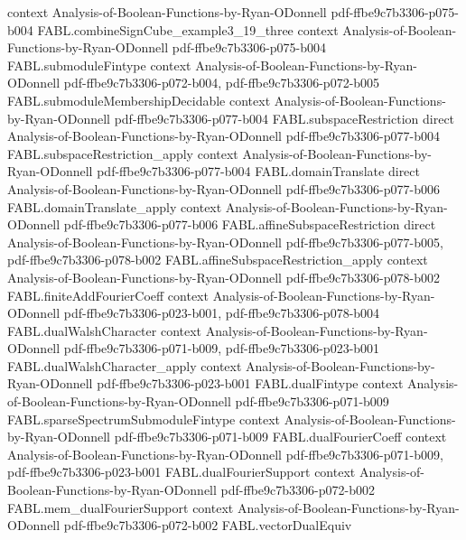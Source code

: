 \begin{theorem}
  {context}
  {Analysis-of-Boolean-Functions-by-Ryan-ODonnell}
  {pdf-ffbe9c7b3306-p075-b004}
\proofstep
  {FABL.combineSignCube_example3_19_three}
  {context}
  {Analysis-of-Boolean-Functions-by-Ryan-ODonnell}
  {pdf-ffbe9c7b3306-p075-b004}
\proofstep
  {FABL.submoduleFintype}
  {context}
  {Analysis-of-Boolean-Functions-by-Ryan-ODonnell}
  {pdf-ffbe9c7b3306-p072-b004,
    pdf-ffbe9c7b3306-p072-b005}
\proofstep
  {FABL.submoduleMembershipDecidable}
  {context}
  {Analysis-of-Boolean-Functions-by-Ryan-ODonnell}
  {pdf-ffbe9c7b3306-p077-b004}
\proofstep
  {FABL.subspaceRestriction}
  {direct}
  {Analysis-of-Boolean-Functions-by-Ryan-ODonnell}
  {pdf-ffbe9c7b3306-p077-b004}
\proofstep
  {FABL.subspaceRestriction_apply}
  {context}
  {Analysis-of-Boolean-Functions-by-Ryan-ODonnell}
  {pdf-ffbe9c7b3306-p077-b004}
\proofstep
  {FABL.domainTranslate}
  {direct}
  {Analysis-of-Boolean-Functions-by-Ryan-ODonnell}
  {pdf-ffbe9c7b3306-p077-b006}
\proofstep
  {FABL.domainTranslate_apply}
  {context}
  {Analysis-of-Boolean-Functions-by-Ryan-ODonnell}
  {pdf-ffbe9c7b3306-p077-b006}
\proofstep
  {FABL.affineSubspaceRestriction}
  {direct}
  {Analysis-of-Boolean-Functions-by-Ryan-ODonnell}
  {pdf-ffbe9c7b3306-p077-b005,
    pdf-ffbe9c7b3306-p078-b002}
\proofstep
  {FABL.affineSubspaceRestriction_apply}
  {context}
  {Analysis-of-Boolean-Functions-by-Ryan-ODonnell}
  {pdf-ffbe9c7b3306-p078-b002}
\proofstep
  {FABL.finiteAddFourierCoeff}
  {context}
  {Analysis-of-Boolean-Functions-by-Ryan-ODonnell}
  {pdf-ffbe9c7b3306-p023-b001,
    pdf-ffbe9c7b3306-p078-b004}
\proofstep
  {FABL.dualWalshCharacter}
  {context}
  {Analysis-of-Boolean-Functions-by-Ryan-ODonnell}
  {pdf-ffbe9c7b3306-p071-b009,
    pdf-ffbe9c7b3306-p023-b001}
\proofstep
  {FABL.dualWalshCharacter_apply}
  {context}
  {Analysis-of-Boolean-Functions-by-Ryan-ODonnell}
  {pdf-ffbe9c7b3306-p023-b001}
\proofstep
  {FABL.dualFintype}
  {context}
  {Analysis-of-Boolean-Functions-by-Ryan-ODonnell}
  {pdf-ffbe9c7b3306-p071-b009}
\proofstep
  {FABL.sparseSpectrumSubmoduleFintype}
  {context}
  {Analysis-of-Boolean-Functions-by-Ryan-ODonnell}
  {pdf-ffbe9c7b3306-p071-b009}
\proofstep
  {FABL.dualFourierCoeff}
  {context}
  {Analysis-of-Boolean-Functions-by-Ryan-ODonnell}
  {pdf-ffbe9c7b3306-p071-b009,
    pdf-ffbe9c7b3306-p023-b001}
\proofstep
  {FABL.dualFourierSupport}
  {context}
  {Analysis-of-Boolean-Functions-by-Ryan-ODonnell}
  {pdf-ffbe9c7b3306-p072-b002}
\proofstep
  {FABL.mem_dualFourierSupport}
  {context}
  {Analysis-of-Boolean-Functions-by-Ryan-ODonnell}
  {pdf-ffbe9c7b3306-p072-b002}
\proofstep
  {FABL.vectorDualEquiv}

\end{theorem}
